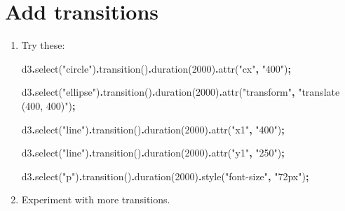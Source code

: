 \documentclass[
  openany]{book}
\newenvironment{Shaded}{\begin{snugshade}}{\end{snugshade}}
\newcommand{\DecValTok}[1]{\textcolor[rgb]{0.00,0.00,0.81}{#1}}
\newcommand{\FunctionTok}[1]{\textcolor[rgb]{0.00,0.00,0.00}{#1}}
\newcommand{\NormalTok}[1]{#1}
\newcommand{\OperatorTok}[1]{\textcolor[rgb]{0.81,0.36,0.00}{\textbf{#1}}}
\newcommand{\StringTok}[1]{\textcolor[rgb]{0.31,0.60,0.02}{#1}}
\begin{document}
\hypertarget{add-transitions}{%
\section{\texorpdfstring{Add transitions }{Add transitions }}\label{add-transitions}}

\begin{enumerate}
\def\labelenumi{\arabic{enumi}.}
\item
  Try these:

\begin{Shaded}
\begin{Highlighting}[]
\NormalTok{d3}\OperatorTok{.}\FunctionTok{select}\NormalTok{(}\StringTok{"circle"}\NormalTok{)}\OperatorTok{.}\FunctionTok{transition}\NormalTok{()}\OperatorTok{.}\FunctionTok{duration}\NormalTok{(}\DecValTok{2000}\NormalTok{)}\OperatorTok{.}\FunctionTok{attr}\NormalTok{(}\StringTok{"cx"}\OperatorTok{,} \StringTok{"400"}\NormalTok{)}\OperatorTok{;}

\NormalTok{d3}\OperatorTok{.}\FunctionTok{select}\NormalTok{(}\StringTok{"ellipse"}\NormalTok{)}\OperatorTok{.}\FunctionTok{transition}\NormalTok{()}\OperatorTok{.}\FunctionTok{duration}\NormalTok{(}\DecValTok{2000}\NormalTok{)}\OperatorTok{.}\FunctionTok{attr}\NormalTok{(}\StringTok{"transform"}\OperatorTok{,} \StringTok{"translate (400, 400)"}\NormalTok{)}\OperatorTok{;}

\NormalTok{d3}\OperatorTok{.}\FunctionTok{select}\NormalTok{(}\StringTok{"line"}\NormalTok{)}\OperatorTok{.}\FunctionTok{transition}\NormalTok{()}\OperatorTok{.}\FunctionTok{duration}\NormalTok{(}\DecValTok{2000}\NormalTok{)}\OperatorTok{.}\FunctionTok{attr}\NormalTok{(}\StringTok{"x1"}\OperatorTok{,} \StringTok{"400"}\NormalTok{)}\OperatorTok{;}

\NormalTok{d3}\OperatorTok{.}\FunctionTok{select}\NormalTok{(}\StringTok{"line"}\NormalTok{)}\OperatorTok{.}\FunctionTok{transition}\NormalTok{()}\OperatorTok{.}\FunctionTok{duration}\NormalTok{(}\DecValTok{2000}\NormalTok{)}\OperatorTok{.}\FunctionTok{attr}\NormalTok{(}\StringTok{"y1"}\OperatorTok{,} \StringTok{"250"}\NormalTok{)}\OperatorTok{;}

\NormalTok{d3}\OperatorTok{.}\FunctionTok{select}\NormalTok{(}\StringTok{"p"}\NormalTok{)}\OperatorTok{.}\FunctionTok{transition}\NormalTok{()}\OperatorTok{.}\FunctionTok{duration}\NormalTok{(}\DecValTok{2000}\NormalTok{)}\OperatorTok{.}\FunctionTok{style}\NormalTok{(}\StringTok{"font{-}size"}\OperatorTok{,} \StringTok{"72px"}\NormalTok{)}\OperatorTok{;}
\end{Highlighting}
\end{Shaded}
\item
  Experiment with more transitions.
\end{enumerate}
\end{document}

